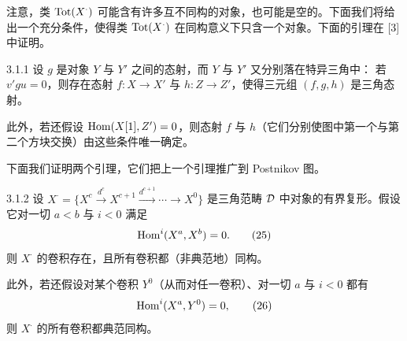 
注意，类 $\operatorname{Tot}(X^{\cdot})$ 可能含有许多互不同构的对象，也可能是空的。下面我们将给出一个充分条件，使得类 $\operatorname{Tot}(X^{\cdot})$ 在同构意义下只含一个对象。下面的引理在 [3] 中证明。

\begin{lemma}{3.1.1}
设 $g$ 是对象 $Y$ 与 $Y'$ 之间的态射，而 $Y$ 与 $Y'$ 又分别落在特异三角中：
若 $v'gu=0$，则存在态射 $f:X\to X'$ 与 $h:Z\to Z'$，使得三元组 $(f,g,h)$ 是三角态射。

此外，若还假设 $\operatorname{Hom}(X[1],Z')=0$，则态射 $f$ 与 $h$（它们分别使图中第一个与第二个方块交换）由这些条件唯一确定。
\end{lemma}

下面我们证明两个引理，它们把上一个引理推广到 Postnikov 图。

\begin{lemma}{3.1.2}
设 $X^{\cdot}=\{X^{c}\xrightarrow{d^{c}}X^{c+1}\xrightarrow{d^{c+1}}\cdots\to X^{0}\}$ 是三角范畴 $\mathcal{D}$ 中对象的有界复形。假设它对一切 $a<b$ 与 $i<0$ 满足
\begin{equation}
\operatorname{Hom}^{i}(X^{a},X^{b})=0.
\tag{25}
\end{equation}
则 $X^{\cdot}$ 的卷积存在，且所有卷积都（非典范地）同构。

此外，若还假设对某个卷积 $Y^{0}$（从而对任一卷积）、对一切 $a$ 与 $i<0$ 都有
\begin{equation}
\operatorname{Hom}^{i}(X^{a},Y^{0})=0,
\tag{26}
\end{equation}
则 $X^{\cdot}$ 的所有卷积都典范同构。
\end{lemma}

